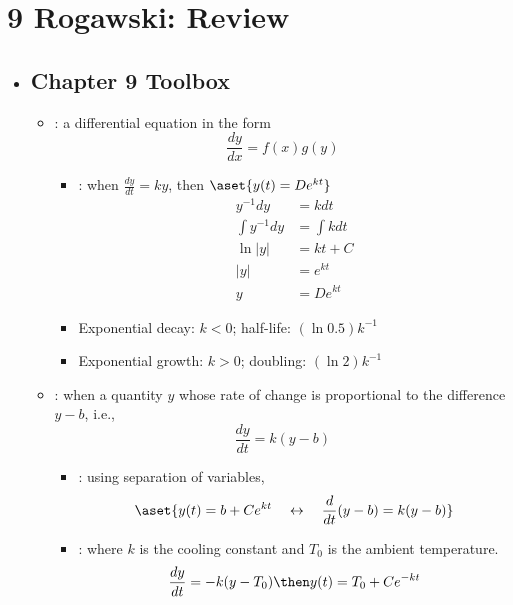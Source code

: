 \section{9 Rogawski: Review}
\begin{itemize}
  \item[]

  \subsection{Chapter 9 Toolbox}
  \begin{itemize}
    \item {}: a differential equation in the form
      \[%
      \frac{dy}{dx} = f (x) g (y)
      \]%
      \begin{itemize}
        \item {}: when \( \frac{dy}{dt} = ky \), then \(\aset{y
          (t) = De^{kt}}\)
          \begin{align*}
            y^{-1}dy &= kdt  \\
            \int y^{-1} dy &= \int kdt  \\
            \ln|y| &= kt + C \\
            |y| &= e^{kt}  \\
            y &= De^{kt}
          \end{align*}
        \item Exponential decay: \(k < 0\); half-life: \((\ln 0.5)k^{-1}\)
        \item Exponential growth: \(k > 0\); doubling: \((\ln 2)k^{-1}\)
      \end{itemize}

    \item {}: when a quantity \(y\)
      whose rate of change is proportional to the difference \(y-b\), i.e.,
      \[%
        \frac{dy}{dt} = k(y-b)
      \]%
    \begin{itemize}
      \item {}: using separation of variables,
        \[%
           \aset{ y (t) = b + Ce^{kt}
           \quad\leftrightarrow\quad
           \frac{d}{dt} (y-b) = k(y-b)}
        \]%
      \item {}: where \(k\) is the cooling constant
         and \(T_0\) is the ambient temperature.
        \[%
          \frac{dy}{dt} = -k(y-T_0) \then y (t) = T_0  + Ce^{-kt}
        \]%


\end{itemize}
\end{itemize}
\end{itemize}
